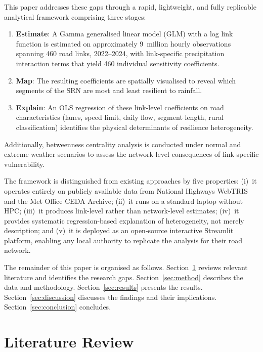 \documentclass[review]{elsarticle}
\begin{document}
This paper addresses these gaps through a rapid, lightweight, and fully replicable analytical framework comprising three stages:

\begin{enumerate}
    \item \textbf{Estimate}: A Gamma generalised linear model (GLM) with a log link function is estimated on approximately 9~million hourly observations spanning 460 road links, 2022--2024, with link-specific precipitation interaction terms that yield 460 individual sensitivity coefficients.
    \item \textbf{Map}: The resulting coefficients are spatially visualised to reveal which segments of the SRN are most and least resilient to rainfall.
    \item \textbf{Explain}: An OLS regression of these link-level coefficients on road characteristics (lanes, speed limit, daily flow, segment length, rural classification) identifies the physical determinants of resilience heterogeneity.
\end{enumerate}

Additionally, betweenness centrality analysis is conducted under normal and extreme-weather scenarios to assess the network-level consequences of link-specific vulnerability.

The framework is distinguished from existing approaches by five properties: (i)~it operates entirely on publicly available data from National Highways WebTRIS and the Met Office CEDA Archive; (ii)~it runs on a standard laptop without HPC; (iii)~it produces link-level rather than network-level estimates; (iv)~it provides systematic regression-based explanation of heterogeneity, not merely description; and (v)~it is deployed as an open-source interactive Streamlit platform, enabling any local authority to replicate the analysis for their road network.

The remainder of this paper is organised as follows. Section~\ref{sec:lit} reviews relevant literature and identifies the research gaps. Section~\ref{sec:method} describes the data and methodology. Section~\ref{sec:results} presents the results. Section~\ref{sec:discussion} discusses the findings and their implications. Section~\ref{sec:conclusion} concludes.


\section{Literature Review}
\label{sec:lit}
\end{document}
